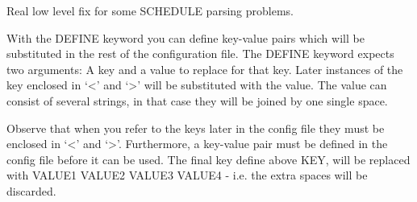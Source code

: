 \documentclass[a4paper,10pt,english]{sphinxmanual}
\begin{document}
\label{\detokenize{keywords/index:add-fixed-length-schedule-kw}}
\begin{sphinxShadowBox}

Real low level fix for some SCHEDULE parsing problems.
\end{sphinxShadowBox}
\label{\detokenize{keywords/index:define}}
\begin{sphinxShadowBox}

With the DEFINE keyword you can define key-value pairs which will be
substituted in the rest of the configuration file. The DEFINE keyword expects
two arguments: A key and a value to replace for that key. Later instances of
the key enclosed in ‘\textless{}’ and ‘\textgreater{}’ will be substituted with the value. The value
can consist of several strings, in that case they will be joined by one single
space.


%
\begin{sphinxVerbatim}[commandchars=\\\{\}]
    
    
    
                                 

        
   
    
\end{sphinxVerbatim}

Observe that when you refer to the keys later in the config file they must be
enclosed in ‘\textless{}’ and ‘\textgreater{}’. Furthermore, a key-value pair must be defined in the
config file before it can be used. The final key define above KEY, will be
replaced with VALUE1 VALUE2 VALUE3 VALUE4 - i.e. the extra spaces will be
discarded.
\end{sphinxShadowBox}
\end{document}

